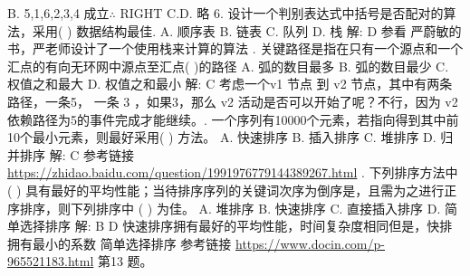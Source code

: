 B. 5,1,6,2,3,4 成立$\therefore$ RIGHT \newline
C.D. 略
6. 设计一个判别表达式中括号是否配对的算法，采用(  ) 数据结构最佳.\newline
A. 顺序表    B. 链表   C. 队列    D. 栈  \newline
解: D \newline
参看 严蔚敏的书，严老师设计了一个使用栈来计算的算法 . 关键路径是指在只有一个源点和一个汇点的有向无环网中源点至汇点(   )的路径\newline
A. 弧的数目最多   B.  弧的数目最少   C.  权值之和最大    D. 权值之和最小\newline
解: C \newline
考虑一个v1 节点 到 v2 节点，其中有两条路径，一条5， 一条 3 ，如果3，那么 v2 活动是否可以开始了呢？不行，因为 v2 依赖路径为5的事件完成才能继续。. 一个序列有10000个元素，若指向得到其中前10个最小元素，则最好采用(  ) 方法。\newline
A. 快速排序  B. 插入排序  C. 堆排序  D. 归并排序 \newline
解: C \newline
参考链接 \url{https://zhidao.baidu.com/question/1991976779144389267.html} . 下列排序方法中 (  ) 具有最好的平均性能；当待排序序列的关键词次序为倒序是，且需为之进行正序排序，则下列排序中 (  ) 为佳。\newline
A. 堆排序  B. 快速排序  C. 直接插入排序  D. 简单选择排序 \newline
解: B D\newline
快速排序拥有最好的平均性能，时间复杂度相同但是，快排拥有最小的系数\newline
简单选择排序 参考链接 \url{https://www.docin.com/p-965521183.html} 第13 题。

